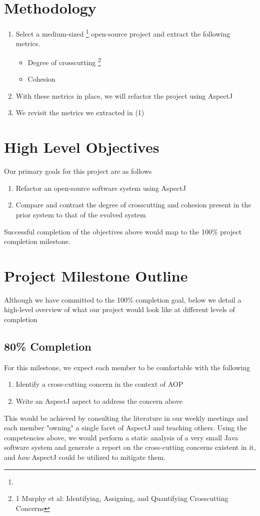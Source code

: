 \documentclass[sigconf]{acmart}
\begin{document}
\section{Methodology}
\begin{enumerate}
    \item Select a medium-sized \footnote{ } open-source project and extract the following metrics.
    \begin{itemize}
    \item Degree of crosscutting \footnote{1 Murphy et al: Identifying, Assigning, and Quantifying Crosscutting Concerns}
    \item Cohesion
\end{itemize}
    \item With these metrics in place, we will refactor the project using AspectJ
    \item We revisit the metrics we extracted in (1)
\end{enumerate}

\section{High Level Objectives}
Our primary goals for this project are as follows
\begin{enumerate}
    \item Refactor an open-source software system using AspectJ
    \item Compare and contrast the degree of crosscutting and cohesion present in the prior system to that of the evolved system
\end{enumerate}

Successful completion of the objectives above would map to the 100\% project completion milestone.

\section{Project Milestone Outline}
Although we have committed to the 100\% completion goal, below we detail a high-level overview of what our project would look like at different levels of completion

\subsection{80\% Completion}
For this milestone, we expect each member to be comfortable with the following
\begin{enumerate}
    \item Identify a cross-cutting concern in the context of AOP
    \item Write an AspectJ aspect to address the concern above
\end{enumerate}
This would be achieved by consulting the literature in our weekly meetings and each member "owning" a single facet of AspectJ and teaching others. Using the competencies above, we would perform a static analysis of a very small Java software system and generate a report on the cross-cutting concerns existent in it, and \textit{how} AspectJ could be utilized to mitigate them.
\end{document}
